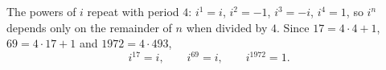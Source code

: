 The powers of $i$ repeat with period $4$: $i^1=i$, $i^2=-1$, $i^3=-i$, $i^4=1$, so $i^n$ depends only on the remainder of $n$ when divided by $4$. Since $17=4\cdot4+1$, $69=4\cdot17+1$ and $1972=4\cdot493$,
\[
i^{17}=\boxed{i},\qquad i^{69}=\boxed{i},\qquad i^{1972}=\boxed{1}.
\]
